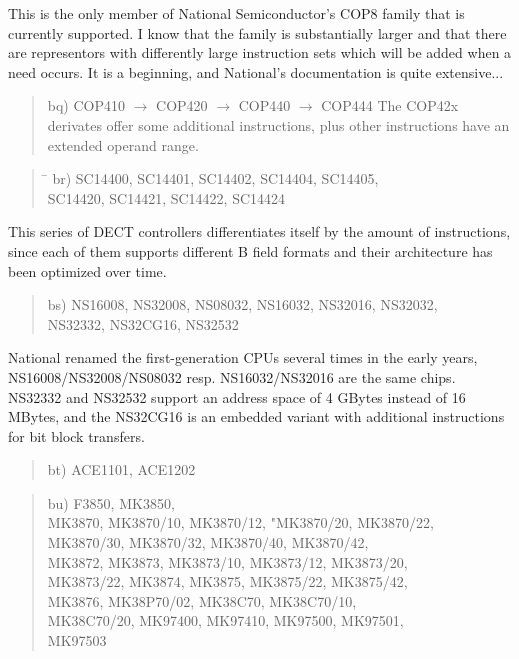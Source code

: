 \documentclass[12pt,twoside]{report}
\begin{document}
This is the only member of National Semiconductor's COP8 family that
is currently supported.  I know that the family is substantially
larger and that there are representors with differently large
instruction sets which will be added when a need occurs.  It is a
beginning, and National's documentation is quite extensive...
\begin{quote}
bq) COP410 $\rightarrow$ COP420 $\rightarrow$ COP440 $\rightarrow$ COP444
The COP42x derivates offer some additional instructions, plus other
instructions have an extended operand range.
\end{quote}
\begin{quote}
\begin{tabbing}
\hspace{0.7cm} \= \kill
br) \> SC14400, SC14401, SC14402, SC14404, SC14405, \\
    \> SC14420, SC14421, SC14422, SC14424 \\
\end{tabbing}
\end{quote}
This series of DECT controllers differentiates itself by the amount of
instructions, since each of them supports different B field formats and
their architecture has been optimized over time.
\begin{quote}
bs) NS16008, NS32008, NS08032, NS16032, NS32016, NS32032, \\
    NS32332, NS32CG16, NS32532
\end{quote}
National renamed the first-generation CPUs several times in the early
years, NS16008/NS32008/NS08032 resp. NS16032/NS32016 are the same chips.
NS32332 and NS32532 support an address space of  4 GBytes instead of 16
MBytes, and the NS32CG16 is an embedded variant with additional instructions
for bit block transfers.
\begin{quote}
bt) ACE1101, ACE1202
\end{quote}
\begin{quote}
bu) F3850, MK3850, \\
    MK3870, MK3870/10, MK3870/12, "MK3870/20, MK3870/22, \\
    MK3870/30, MK3870/32, MK3870/40, MK3870/42, \\
    MK3872, MK3873, MK3873/10, MK3873/12, MK3873/20, \\
    MK3873/22, MK3874, MK3875, MK3875/22, MK3875/42, \\
    MK3876, MK38P70/02, MK38C70, MK38C70/10, \\
    MK38C70/20, MK97400, MK97410, MK97500, MK97501, \\
    MK97503
\end{quote}
\end{document}
